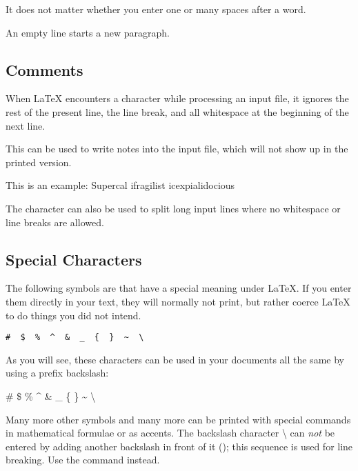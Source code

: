 \begin{example}
It does not matter whether you
enter one or many     spaces
after a word.

An empty line starts a new
paragraph.
\end{example}

\subsection{Comments}\label{sec:comments}

When \LaTeX{} encounters a \ai{\%} character while processing an input file,
it ignores the rest of the present line, the line break, and all
whitespace at the beginning of the next line.

This can be used to write notes into the input file, which will not show up
in the printed version.

\begin{example}
This is an %
example: Supercal%
              ifragilist%
    icexpialidocious
\end{example}

The \ai{\%} character can also be used to split long input lines where no
whitespace or line breaks are allowed.

\subsection{Special Characters}

The following symbols are  that have a special meaning
under \LaTeX{}. If you enter them directly in your text, they will normally not
print, but rather coerce \LaTeX{} to do things you did not intend.
\begin{code}
\verb.#  $  %  ^  &  _  {  }  ~  \ . %
\end{code}

As you will see, these characters can be used in your documents all
the same by using a prefix backslash:

\begin{example}
\# \$ \% \^{} \& \_ \{ \} \~{}
\textbackslash{}
\end{example}

Many more other symbols and many more can be printed with special commands
in mathematical formulae or as accents. The backslash character
\textbackslash{} can \emph{not} be entered by adding another backslash
in front of it (\csi{\bs}); this sequence is used for
line breaking. Use the  command instead.

